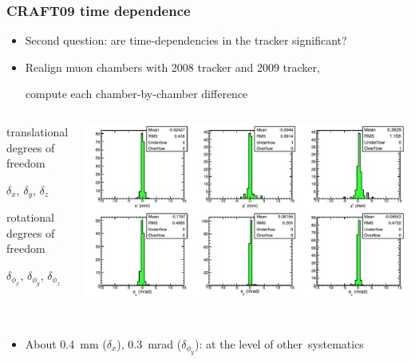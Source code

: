 \documentclass[compress]{beamer}
\begin{document}
\begin{frame}
\frametitle{CRAFT09 time dependence}
\begin{itemize}
\item Second question: are time-dependencies in the tracker significant?
\item Realign muon chambers with 2008 tracker and 2009 tracker,

compute each chamber-by-chamber difference
\end{itemize}

\vspace{-0.25 cm}
\begin{columns}
\begin{center}
translational degrees of freedom

$\delta_x$, $\delta_y$, $\delta_z$

\vspace{0.75 cm}
rotational degrees of freedom

$\delta_{\phi_x}$, $\delta_{\phi_y}$, $\delta_{\phi_z}$

\vspace{0.5 cm}
\mbox{ }
\end{center}
\includegraphics[width=\linewidth]{effect_of_trackeralignment.pdf}
\end{columns}

\vspace{-0.25 cm}
\begin{itemize}
\item About 0.4~mm ($\delta_x$), 0.3~mrad ($\delta_{\phi_y}$): at the level of \mbox{other systematics\hspace{-1 cm}}
\end{itemize}
\end{frame}
\end{document}
